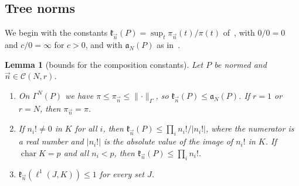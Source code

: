 \documentclass[11pt]{amsart}
\newtheorem{lemma}[theorem]{Lemma}
\theoremstyle{definition}
\theoremstyle{remark}
\numberwithin{equation}{section}
\newcommand{\abs}[1]{\lvert #1\rvert}
\newcommand{\norm}[1]{\lVert #1\rVert}
\theoremstyle{plain}
\theoremstyle{definition}
\theoremstyle{plain}
\begin{document}
\subsection{Tree norms}\label{dp:ssec:tree}

We begin with the constants $\mathfrak k_{\vec n}(P)=\sup_t\pi_{\vec n}(t)/\pi(t)$ of~\cite[Definition~14.21]{I}, with $0/0=0$ and $c/0=\infty$ for $c>0$, and with $\mathfrak a_N(P)$ as in~\cite[Definition~14.36]{I}.

\begin{lemma}[bounds for the composition constants]\label{dp:lem:kappa-bounds}
Let $P$ be normed and $\vec n\in\mathcal C(N,r)$.
\begin{enumerate}
\item On $\Gamma^N(P)$ we have $\pi\le\pi_{\vec n}\le\norm\cdot_\Gamma$, so $\mathfrak k_{\vec n}(P)\le\mathfrak a_N(P)$. If $r=1$ or $r=N$, then $\pi_{\vec n}=\pi$.
\item If $n_i!\ne0$ in $K$ for all $i$, then $\mathfrak k_{\vec n}(P)\le\prod_in_i!/\abs{n_i!}$, where the numerator is a real number and $\abs{n_i!}$ is the absolute value of the image of $n_i!$ in $K$. If $\operatorname{char}K=p$ and all $n_i<p$, then $\mathfrak k_{\vec n}(P)\le\prod_in_i!$.
\item $\mathfrak k_{\vec n}(\ell^1(J,K))\le1$ for every set $J$.
\end{enumerate}
\end{lemma}
\end{document}
